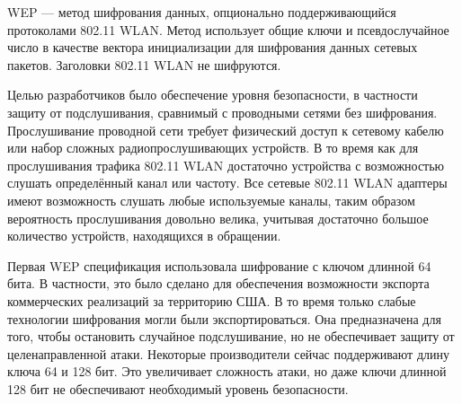WEP --- метод шифрования данных, опционально поддерживающийся протоколами 802.11
WLAN. Метод использует общие ключи и псевдослучайное число в качестве вектора
инициализации для шифрования данных сетевых пакетов. Заголовки 802.11 WLAN не
шифруются.

Целью разработчиков было обеспечение уровня безопасности, в частности защиту от
подслушивания, сравнимый с проводными сетями без шифрования. Прослушивание
проводной сети требует физический доступ к сетевому кабелю или набор сложных
радиопрослушивающих устройств. В то время как для прослушивания трафика 802.11
WLAN достаточно устройства с возможностью слушать определённый канал или
частоту. Все сетевые 802.11 WLAN адаптеры имеют возможность слушать любые
используемые каналы, таким образом вероятность прослушивания довольно велика,
учитывая достаточно большое количество устройств, находящихся в обращении.

Первая WEP спецификация использовала шифрование с ключом длинной 64 бита. В
частности, это было сделано для обеспечения возможности экспорта коммерческих
реализаций за территорию США. В то время только слабые технологии шифрования
могли были экспортироваться. Она предназначена для того, чтобы остановить
случайное подслушивание, но не обеспечивает защиту от целенаправленной атаки.
Некоторые производители сейчас поддерживают длину ключа 64 и 128 бит. Это
увеличивает сложность атаки, но даже ключи длинной 128 бит не обеспечивают
необходимый уровень безопасности.


